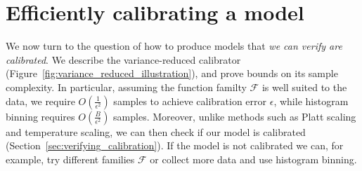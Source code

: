 

\section{Efficiently calibrating a model}

We now turn to the question of how to produce models that \emph{we can verify are calibrated}.
We describe the variance-reduced calibrator (Figure~\ref{fig:variance_reduced_illustration}), and prove bounds on its sample complexity.
In particular, assuming the function familty $\mathcal{F}$ is well suited to the data, we require $O(\frac{1}{\epsilon^2})$ samples to achieve calibration error $\epsilon$, while histogram binning requires $O(\frac{B}{\epsilon^2})$ samples.
Moreover, unlike methods such as Platt scaling and temperature scaling, we can then check if our model is calibrated (Section~\ref{sec:verifying_calibration}).
If the model is not calibrated we can, for example, try different families $\mathcal{F}$ or collect more data and use histogram binning.




